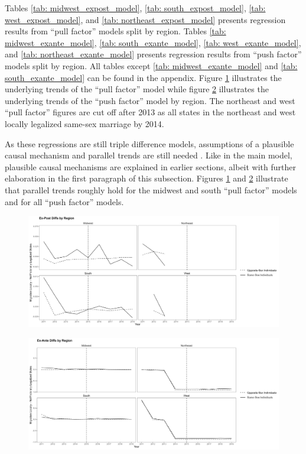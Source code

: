 \documentclass[12pt,letterpaper]{article}
\begin{document}


Tables \ref{tab: midwest_expost_model}, \ref{tab: south_expost_model}, \ref{tab: west_expost_model}, and \ref{tab: northeast_expost_model} presents regression results from “pull factor” models split by region. Tables \ref{tab: midwest_exante_model}, \ref{tab: south_exante_model}, \ref{tab: west_exante_model}, and \ref{tab: northeast_exante_model}  presents regression results from “push factor” models split by region. All tables except \ref{tab: midwest_exante_model} and \ref{tab: south_exante_model} can be found in the appendix. Figure \ref{fig: region_post_diffs} illustrates the underlying trends of the “pull factor” model while figure \ref{fig: region_ante_diffs} illustrates the underlying trends of the “push factor” model by region. The northeast and west “pull factor” figures are cut off after 2013 as all states in the northeast and west locally legalized same-sex marriage by 2014.

As these regressions are still triple difference models, assumptions of a plausible causal mechanism and parallel trends are still needed \citep{24, 25}. Like in the main model, plausible causal mechanisms are explained in earlier sections, albeit with further elaboration in the first paragraph of this subsection. Figures \ref{fig: region_post_diffs} and \ref{fig: region_ante_diffs} illustrate that parallel trends roughly hold for the midwest and south “pull factor” models and for all “push factor” models. 

\begin{figure}[p]
    \centering
    \includegraphics[width=1\linewidth]{outputs/summary_stats/region_post_diffs.png}
    \caption{}
    \label{fig: region_post_diffs}
\end{figure}

\begin{figure}[p]
    \centering
    \includegraphics[width=1\linewidth]{outputs/summary_stats/region_ante_diffs.png}
    \caption{}
    \label{fig: region_ante_diffs}
\end{figure}
\end{document}
